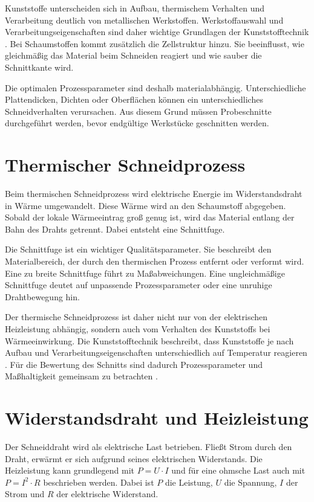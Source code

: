 Kunststoffe unterscheiden sich in Aufbau, thermischem Verhalten und Verarbeitung deutlich von metallischen Werkstoffen. Werkstoffauswahl und Verarbeitungseigenschaften sind daher wichtige Grundlagen der Kunststofftechnik \cite{Bonnet:2025}. Bei Schaumstoffen kommt zusätzlich die Zellstruktur hinzu. Sie beeinflusst, wie gleichmäßig das Material beim Schneiden reagiert und wie sauber die Schnittkante wird.

Die optimalen Prozessparameter sind deshalb materialabhängig. Unterschiedliche Plattendicken, Dichten oder Oberflächen können ein unterschiedliches Schneidverhalten verursachen. Aus diesem Grund müssen Probeschnitte durchgeführt werden, bevor endgültige Werkstücke geschnitten werden.

\section{Thermischer Schneidprozess}
\label{sec:hardware_thermischer_schneidprozess}

Beim thermischen Schneidprozess wird elektrische Energie im Widerstandsdraht in Wärme umgewandelt. Diese Wärme wird an den Schaumstoff abgegeben. Sobald der lokale Wärmeeintrag groß genug ist, wird das Material entlang der Bahn des Drahts getrennt. Dabei entsteht eine Schnittfuge.

Die Schnittfuge ist ein wichtiger Qualitätsparameter. Sie beschreibt den Materialbereich, der durch den thermischen Prozess entfernt oder verformt wird. Eine zu breite Schnittfuge führt zu Maßabweichungen. Eine ungleichmäßige Schnittfuge deutet auf unpassende Prozessparameter oder eine unruhige Drahtbewegung hin.

Der thermische Schneidprozess ist daher nicht nur von der elektrischen Heizleistung abhängig, sondern auch vom Verhalten des Kunststoffs bei Wärmeeinwirkung. Die Kunststofftechnik beschreibt, dass Kunststoffe je nach Aufbau und Verarbeitungseigenschaften unterschiedlich auf Temperatur reagieren \cite{Bonnet:2025}. Für die Bewertung des Schnitts sind dadurch Prozessparameter und Maßhaltigkeit gemeinsam zu betrachten \cite{Fritz:2022}.

\section{Widerstandsdraht und Heizleistung}
\label{sec:widerstandsdraht_heizleistung}

Der Schneiddraht wird als elektrische Last betrieben. Fließt Strom durch den Draht, erwärmt er sich aufgrund seines elektrischen Widerstands. Die Heizleistung kann grundlegend mit
\(
P = U \cdot I
\)
und für eine ohmsche Last auch mit
\(
P = I^2 \cdot R
\)
beschrieben werden. Dabei ist \(P\) die Leistung, \(U\) die Spannung, \(I\) der Strom und \(R\) der elektrische Widerstand.

